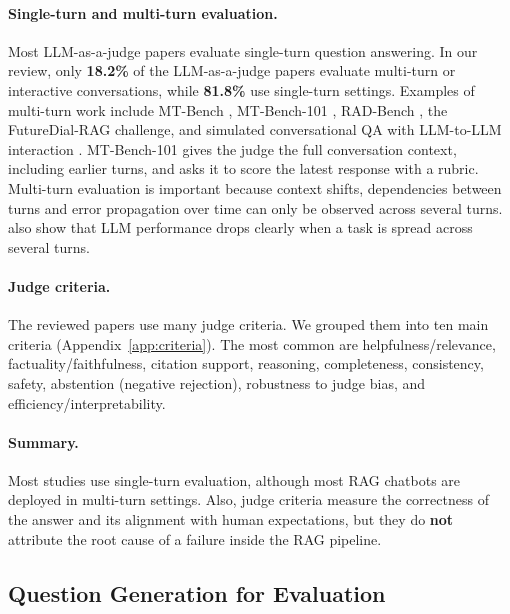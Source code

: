 \documentclass[11pt]{article}
\begin{document}
\paragraph{Single-turn and multi-turn evaluation.}
Most LLM-as-a-judge papers evaluate single-turn question answering. In our review, only \textbf{18.2\%} of the LLM-as-a-judge papers evaluate multi-turn or interactive conversations, while \textbf{81.8\%} use single-turn settings. Examples of multi-turn work include MT-Bench \citep{zheng2023judging}, MT-Bench-101 \citep{bai2024mtbench101}, RAD-Bench \citep{kuo2024radbench}, the FutureDial-RAG challenge, and simulated conversational QA with LLM-to-LLM interaction \citep{abbasiantaeb2024}. MT-Bench-101 gives the judge the full conversation context, including earlier turns, and asks it to score the latest response with a rubric. Multi-turn evaluation is important because context shifts, dependencies between turns and error propagation over time can only be observed across several turns. \citet{laban2025lost} also show that LLM performance drops clearly when a task is spread across several turns.

\paragraph{Judge criteria.}
The reviewed papers use many judge criteria. We grouped them into ten main criteria (Appendix~\ref{app:criteria}). The most common are helpfulness/relevance, factuality/faithfulness, citation support, reasoning, completeness, consistency, safety, abstention (negative rejection), robustness to judge bias, and efficiency/interpretability.

\paragraph{Summary.}
Most studies use single-turn evaluation, although most RAG chatbots are deployed in multi-turn settings. Also, judge criteria measure the correctness of the answer and its alignment with human expectations, but they do \textbf{not} attribute the root cause of a failure inside the RAG pipeline.

\subsection{Question Generation for Evaluation}
\end{document}
